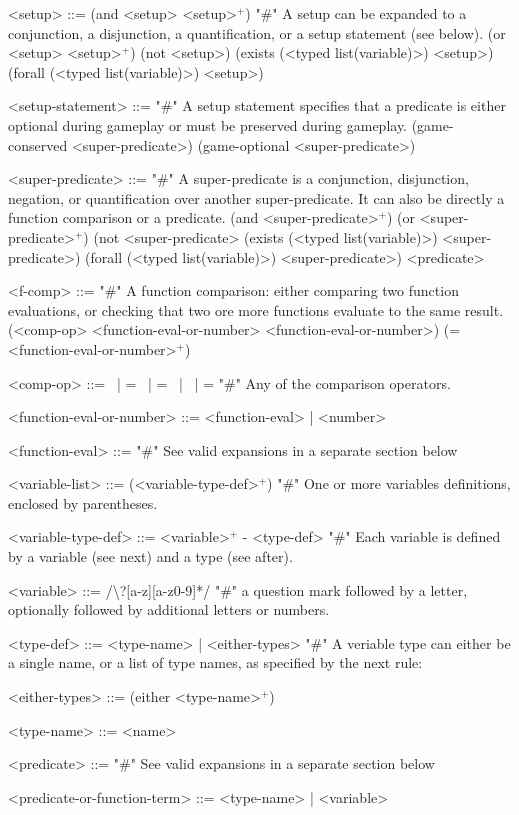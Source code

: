 \documentclass{article}
\begin{document}
\begin{grammar}
<setup> ::= (and <setup> <setup>$^+$) "#" A setup can be expanded to a conjunction, a disjunction, a quantification, or a setup statement (see below).
    \alt (or <setup> <setup>$^+$)
    \alt (not <setup>)
    \alt (exists (<typed list(variable)>) <setup>)
    \alt (forall (<typed list(variable)>) <setup>)

<setup-statement> ::= "#" A setup statement specifies that a predicate is either optional during gameplay or must be preserved during gameplay.
    \alt (game-conserved <super-predicate>)
    \alt (game-optional <super-predicate>)

<super-predicate> ::= "#" A super-predicate is a conjunction, disjunction, negation, or quantification over another super-predicate. It can also be directly a function comparison or a predicate.
    \alt (and <super-predicate>$^+$)
    \alt (or <super-predicate>$^+$)
    \alt (not <super-predicate>
    \alt (exists (<typed list(variable)>) <super-predicate>)
    \alt (forall (<typed list(variable)>) <super-predicate>)
    \alt <predicate>


<f-comp> ::= "#" A function comparison: either comparing two function evaluations, or checking that two ore more functions evaluate to the same result.
    \alt (<comp-op> <function-eval-or-number> <function-eval-or-number>)
    \alt (= <function-eval-or-number>$^+$)

<comp-op> ::=  \textlangle \ | \textlangle = \ | = \ | \textrangle \ | \textrangle = "#" Any of the comparison operators.

<function-eval-or-number> ::= <function-eval> | <number>

<function-eval> ::= "#" See valid expansions in a separate section below


<variable-list> ::= (<variable-type-def>$^+$) "#" One or more variables definitions, enclosed by parentheses.

<variable-type-def> ::= <variable>$^+$ - <type-def> "#" Each variable is defined by a variable (see next) and a type (see after).

<variable> ::= /\textbackslash?[a-z][a-z0-9]*/  "#" a question mark followed by a letter, optionally followed by additional letters or numbers.

<type-def> ::= <type-name> | <either-types> "#" A veriable type can either be a single name, or a list of type names, as specified by the next rule:

<either-types> ::= (either <type-name>$^+$)

<type-name> ::= <name>

<predicate> ::= "#" See valid expansions in a separate section below

<predicate-or-function-term> ::= <type-name> | <variable>


\end{grammar}
\end{document}
